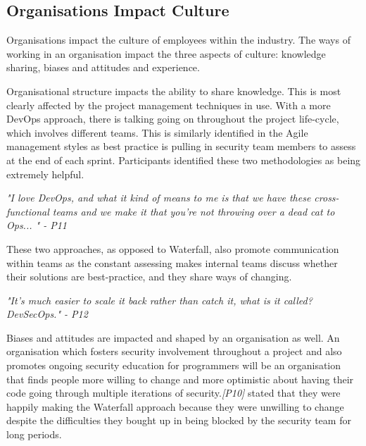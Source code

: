 \subsection{Organisations Impact Culture}

\par Organisations impact the culture of employees within the industry. The ways of working in an organisation impact the three aspects of culture: knowledge sharing, biases and attitudes and experience.
\newline
\par
Organisational structure impacts the ability to share knowledge. This is most clearly affected by the project management techniques in use. With a more DevOps approach, there is talking going on throughout the project life-cycle, which involves different teams. This is similarly identified in the Agile management styles as best practice is pulling in security team members to assess at the end of each sprint. Participants identified these two methodologies as being extremely helpful. 
\newline
\par
\textit{"I love DevOps, and what it kind of means to me is that we have these cross-functional teams and we make it that you're not throwing over a dead cat to Ops... " - P11}
\newline
\par
These two approaches, as opposed to Waterfall, also promote communication within teams as the constant assessing makes internal teams discuss whether their solutions are best-practice, and they share ways of changing. 
\newline
\par 
\textit{"It's much easier to scale it back rather than catch it, what is it called? DevSecOps." - P12}
\newline
\par
Biases and attitudes are impacted and shaped by an organisation as well. An organisation which fosters security involvement throughout a project and also promotes ongoing security education for programmers will be an organisation that finds people more willing to change and more optimistic about having their code going through multiple iterations of security.\textit{[P10]} stated that they were happily making the Waterfall approach because they were unwilling to change despite the difficulties they bought up in being blocked by the security team for long periods. 
\newline
\par
